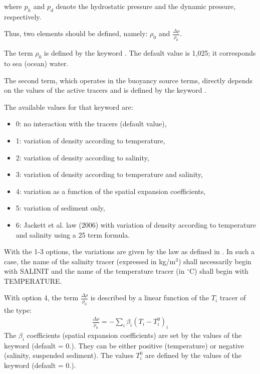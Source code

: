 where $p_{h} $ and $p_{d} $ denote the hydrostatic pressure and the dynamic
pressure, respectively.

Thus, two elements should be defined, namely: $\rho_{0} $ and $\frac{\Delta
\rho }{\rho _{0} } $.

The term $\rho _{0} $ is defined by the keyword .
The default value is 1,025; it corresponds to sea (ocean) water.

The second term, which operates in the buoyancy source terms, directly depends
on the values of the active tracers and is defined by the keyword
.

The available values for that keyword  are:

\begin{itemize}
\item  0: no interaction with the tracers (default value),

\item  1: variation of density according to temperature,

\item  2: variation of density according to salinity,

\item  3: variation of density according to temperature and salinity,

\item  4: variation as a function of the spatial expansion coefficients,

\item  5: variation of sediment only,

\item  6: Jackett et al. law (2006) with variation of density according to
          temperature and salinity using a 25 term formula.
\end{itemize}

With the 1-3 options, the variations are given by the law as defined in
. In such a case, the name of the salinity tracer (expressed in
kg/m${}^{3}$) shall necessarily begin with SALINIT and the name of the
temperature tracer (in ${}^\circ$C) shall begin with TEMPERATURE.

With option 4, the term $\frac{\Delta \rho }{\rho _{0} } $ is described by a
linear function of the $T_i$ tracer of the type:
\begin{align}
\frac{\Delta \rho }{\rho _{0} } =-\sum _{i}\beta _{i}  (T_{i} -T_{i}^{0} )_{i}
\end{align}
The $\beta_{i}$ coefficients (spatial expansion coefficients) are set by the
values of the keyword  (default
= 0.). They can be either positive (temperature) or negative (salinity,
suspended sediment). The values $T_{i}^{0}$ are defined by the values of the
keyword  (default = 0.).

